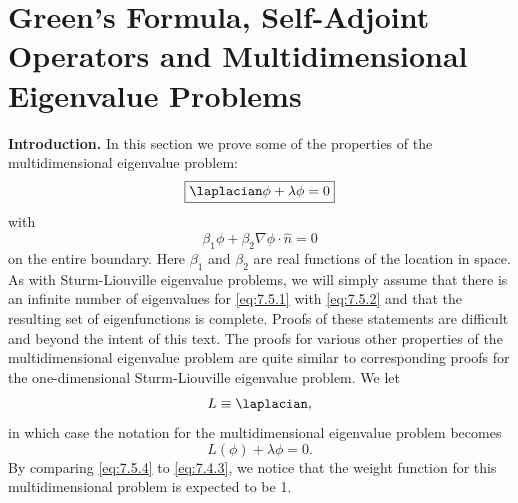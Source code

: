 \section{Green's Formula, Self-Adjoint Operators and Multidimensional Eigenvalue Problems}
\label{sec:7.5}

\textbf{Introduction.}  In this section we prove some of the properties of the multidimensional eigenvalue problem:
\begin{equation}
\boxed{\laplacian\phi + \lambda\phi = 0}
\label{eq:7.5.1}
\end{equation}
with
\begin{equation}
\boxed{\beta_1\phi + \beta_2\nabla\phi\cdot\hat{n} = 0}
\label{eq:7.5.2}
\end{equation}
on the entire boundary.  Here $\beta_1$ and $\beta_2$ are real functions of the location in space.  As with Sturm-Liouville eigenvalue problems, we will simply assume that there is an infinite number of eigenvalues for \eqref{eq:7.5.1} with \eqref{eq:7.5.2} and that the resulting set of eigenfunctions is complete.  Proofs of these statements are difficult and beyond the intent of this text.  The proofs for various other properties of the multidimensional eigenvalue problem are quite similar to corresponding proofs for the one-dimensional Sturm-Liouville eigenvalue problem.  We let
\begin{equation}
L \equiv \laplacian,
\label{eq:7.5.3}
\end{equation}
in which case the notation for the multidimensional eigenvalue problem becomes
\begin{equation}
L(\phi) + \lambda\phi = 0.
\label{eq:7.5.4}
\end{equation}
By comparing \eqref{eq:7.5.4} to \eqref{eq:7.4.3}, we notice that the weight function for this multidimensional problem is expected to be 1.

